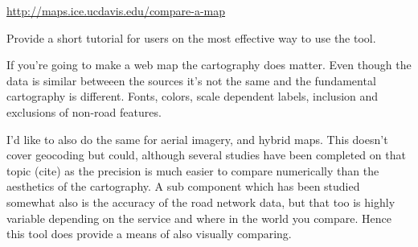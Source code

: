 \documentclass[12pt,letterpaper]{article}
\begin{document}
\url{http://maps.ice.ucdavis.edu/compare-a-map}

Provide a short tutorial for users on the most effective way to use the tool.

If you're going to make a web map the cartography does matter. Even though the data is similar betweeen the sources it's not the same and the fundamental cartography is different. 
Fonts, colors, scale dependent labels, inclusion and exclusions of non-road features.

I'd like to also do the same for aerial imagery, and hybrid maps. This doesn't cover geocoding but could, although several studies have been completed on that topic (cite) as the precision is much easier to compare numerically than the aesthetics of the cartography. A sub component which has been studied somewhat also is the accuracy of the road network data, but that too is highly variable depending on the service and where in the world you compare. Hence this tool does provide a means of also visually comparing.

\end{document}
